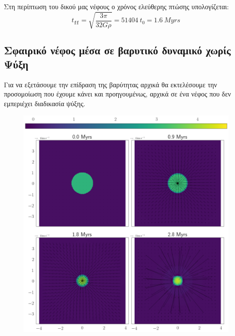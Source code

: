 	Στη περίπτωση του δικού μας νέφους ο χρόνος ελεύθερης πτώσης υπολογίζεται:
	\begin{equation}
		t_\texttt{ff}=\sqrt{\frac{3\pi}{32G\rho}} = \SI{51404}{t_0} = \SI{1.6}{Myrs}
	\end{equation}
	
	\subsection{Σφαιρικό νέφος μέσα σε βαρυτικό δυναμικό χωρίς Ψύξη}
	
	Για να εξετάσουμε την επίδραση της βαρύτητας αρχικά θα εκτελέσουμε την προσομοίωση που έχουμε κάνει και προηγουμένως, αρχικά σε ένα νέφος που δεν εμπεριέχει διαδικασία ψύξης.
	
\begin{figure}[h]
	\centering
	\includegraphics[width=1\linewidth]{DataImages/NoCoolGRquad}
	\caption{}
	\label{fig:nocoolgrquad}
\end{figure}

